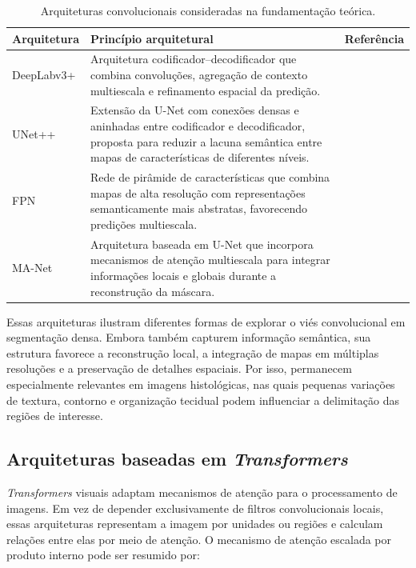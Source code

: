 \begin{table}[!htb] \centering \caption{Arquiteturas convolucionais consideradas na fundamentação teórica.} \label{tab:cnn-models} \begin{tabular}{p{2.8cm}p{8.4cm}p{3.0cm}} \toprule Arquitetura & Princípio arquitetural & Referência \\ \midrule DeepLabv3+ & Arquitetura codificador--decodificador que combina convoluções, agregação de contexto multiescala e refinamento espacial da predição. & \cite{chen2018deeplabv3plus} \\ UNet++ & Extensão da U-Net com conexões densas e aninhadas entre codificador e decodificador, proposta para reduzir a lacuna semântica entre mapas de características de diferentes níveis. & \cite{zhou2020unetpp} \\ FPN & Rede de pirâmide de características que combina mapas de alta resolução com representações semanticamente mais abstratas, favorecendo predições multiescala. & \cite{lin2017fpn} \\ MA-Net & Arquitetura baseada em U-Net que incorpora mecanismos de atenção multiescala para integrar informações locais e globais durante a reconstrução da máscara. & \cite{fan2020manet} \\ \bottomrule \end{tabular} \end{table} 

Essas arquiteturas ilustram diferentes formas de explorar o viés convolucional em segmentação densa. Embora também capturem informação semântica, sua estrutura favorece a reconstrução local, a integração de mapas em múltiplas resoluções e a preservação de detalhes espaciais. Por isso, permanecem especialmente relevantes em imagens histológicas, nas quais pequenas variações de textura, contorno e organização tecidual podem influenciar a delimitação das regiões de interesse.

\subsection{Arquiteturas baseadas em \textit{Transformers}} \label{subsec:arquiteturas_transformers} 

\textit{Transformers} visuais adaptam mecanismos de atenção para o processamento de imagens. Em vez de depender exclusivamente de filtros convolucionais locais, essas arquiteturas representam a imagem por unidades ou regiões e calculam relações entre elas por meio de atenção. O mecanismo de atenção escalada por produto interno pode ser resumido por: 

